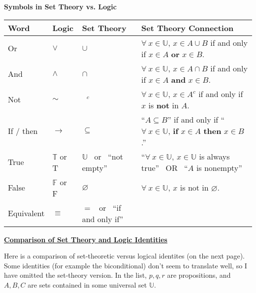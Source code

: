 \documentclass[11pt]{article}
\begin{document}
\begin{center}
    {\bf Symbols in Set Theory vs. Logic}

\begin{tabular}{l|l|l|l}
\toprule
Word & Logic & Set Theory & Set Theory Connection  \\
\midrule
Or   &     $\vee$   &         $\cup$    &  $\forall \ x \in \mathbb{U}$, $x \in A\cup B$ if and only if $x \in A$ {\bf or} $x\in B$. \\
And  &     $\wedge$ &         $\cap$    &  $\forall \ x \in \mathbb{U}$, $x \in A \cap B$ if and only if $x \in A$ {\bf and} $x \in B$. \\
Not  &     $\sim$   &   $\phantom{h}^c$ & $\forall \ x \in \mathbb{U}$, $x\in A^c$ if and only if $x$ is {\bf not} in $A$. \\
If / then & $\to$   &  $\subseteq$      & ``$A \subseteq B$'' if and only if ``$\forall \ x \in \mathbb{U}$, {\bf if} $x\in A$ {\bf then} $x\in B$.'' \\
True & $\mathbb{T}$ or T & $\mathbb{U}$  \ or \ ``not empty'' & ``$\forall \ x\in \mathbb{U}$, $x \in \mathbb{U}$ is always true'' \ OR  \  ``$A$ is nonempty''\\
False & $\mathbb{F}$ or F & $\varnothing$ & $\forall \ x\in \mathbb{U}$, $x$ is not in $\varnothing$. \\
Equivalent & $\equiv$ &  $=$ \ or \   ``if and only if''    \\
\bottomrule
\end{tabular}
\end{center}

\bigskip
\begin{center}\underline{\bf \Large Comparison of Set Theory and Logic Identities}\end{center}

\bigskip
Here is a comparison of set-theoretic versus logical identites (on the next page). Some 
identities (for example the biconditional) don't seem to translate well, 
so I have omitted the set-theory version. In the list, 
$p, q, r$ are propositions, and $A,B, C$ are sets contained in some universal set $\mathbb{U}$. 


\newpage
{}
\end{document}
